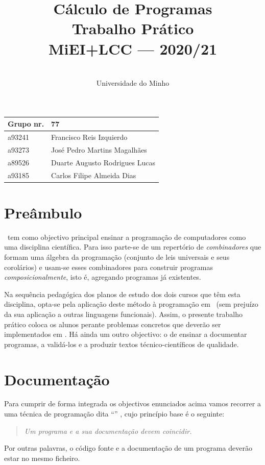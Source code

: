 \documentclass[a4paper]{article}
\title{
       	Cálculo de Programas
\\
       	Trabalho Prático
\\
       	MiEI+LCC --- 2020/21
}
\author{
       	\dium
\\
       	Universidade do Minho
}
\date\mydate
\begin{document}
\maketitle

\begin{center}\large
\begin{tabular}{ll}
\textbf{Grupo} nr. & 77 
\\\hline
a93241 & Francisco Reis Izquierdo	
\\
a93273 & José Pedro Martins Magalhães
\\
a89526 & Duarte Augusto Rodrigues Lucas	
\\
a93185 & Carlos Filipe Almeida Dias
\end{tabular}
\end{center}

\section{Preâmbulo}

\CP\ tem como objectivo principal ensinar
a progra\-mação de computadores como uma disciplina científica. Para isso
parte-se de um repertório de \emph{combinadores} que formam uma álgebra da
programação (conjunto de leis universais e seus corolários) e usam-se esses
combinadores para construir programas \emph{composicionalmente}, isto é,
agregando programas já existentes.
  
Na sequência pedagógica dos planos de estudo dos dois cursos que têm
esta disciplina, opta-se pela aplicação deste método à programação
em \Haskell\ (sem prejuízo da sua aplicação a outras linguagens 
funcionais). Assim, o presente trabalho prático coloca os
alunos perante problemas concretos que deverão ser implementados em
\Haskell.  Há ainda um outro objectivo: o de ensinar a documentar
programas, a validá-los e a produzir textos técnico-científicos de
qualidade.

\section{Documentação} Para cumprir de forma integrada os objectivos
enunciados acima vamos recorrer a uma técnica de programa\-ção dita
``'' \cite{Kn92}, cujo princípio base é o seguinte:
%
\begin{quote}\em Um programa e a sua documentação devem coincidir.
\end{quote}
%
Por outras palavras, o código fonte e a documentação de um
programa deverão estar no mesmo ficheiro.
\end{document}
